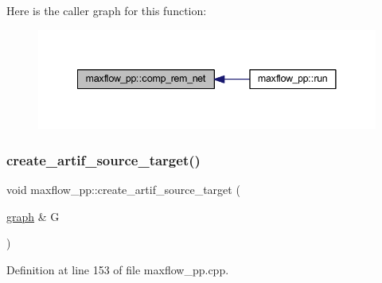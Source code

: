 Here is the caller graph for this function\+:\nopagebreak
\begin{figure}[H]
\begin{center}
\leavevmode
\includegraphics[width=341pt]{classmaxflow__pp_a97612b9517f0f11715610cb8faa81606_icgraph}
\end{center}
\end{figure}
\mbox{\label{classmaxflow__pp_a02438e89291eeccda0b247d20ffa11e5}} 
\subsubsection{\texorpdfstring{create\+\_\+artif\+\_\+source\+\_\+target()}{create\_artif\_source\_target()}}
{\footnotesize\ttfamily void maxflow\+\_\+pp\+::create\+\_\+artif\+\_\+source\+\_\+target (\begin{DoxyParamCaption}\item[{\mbox{\hyperlink{classgraph}{graph}} \&}]{G }\end{DoxyParamCaption})\hspace{0.3cm}{\ttfamily [protected]}}



Definition at line 153 of file maxflow\+\_\+pp.\+cpp.


